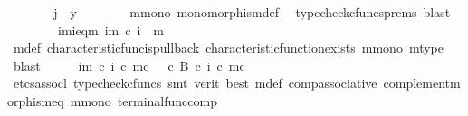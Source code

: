 \begin{isabellebody}
\ \ \ \ \isamarkupfalse%
\ \isamarkupfalse%
\ {\isachardoublequoteopen}j\ {\isacharequal}{\kern0pt}\ y{\isachardoublequoteclose}\isanewline
\ \ \ \ \ \ \isamarkupfalse%
\ m{\isacharunderscore}{\kern0pt}mono\ monomorphism{\isacharunderscore}{\kern0pt}def{}\ \isamarkupfalse%
\ {\isacharparenleft}{\kern0pt}typecheck{\isacharunderscore}{\kern0pt}cfuncs{\isacharunderscore}{\kern0pt}prems{\isacharcomma}{\kern0pt}\ blast{\isacharparenright}{\kern0pt}\isanewline
\ \ \isamarkupfalse%
\isanewline
\ \ \isamarkupfalse%
\ \isamarkupfalse%
\ {\isasymchi}im{\isacharunderscore}{\kern0pt}i{\isacharunderscore}{\kern0pt}eq{\isacharunderscore}{\kern0pt}{\isasymchi}m{\isacharcolon}{\kern0pt}\ {\isachardoublequoteopen}{\isasymchi}im\ {\isasymcirc}\isactrlsub c\ i\ {\isacharequal}{\kern0pt}\ {\isasymchi}m{\isachardoublequoteclose}\isanewline
\ \ \ \ \isamarkupfalse%
\ {\isasymchi}m{\isacharunderscore}{\kern0pt}def\ characteristic{\isacharunderscore}{\kern0pt}func{\isacharunderscore}{\kern0pt}is{\isacharunderscore}{\kern0pt}pullback\ characteristic{\isacharunderscore}{\kern0pt}function{\isacharunderscore}{\kern0pt}exists\ m{\isacharunderscore}{\kern0pt}mono\ m{\isacharunderscore}{\kern0pt}type\ \isamarkupfalse%
\ blast\isanewline
\ \ \isamarkupfalse%
\ \isamarkupfalse%
\ {\isachardoublequoteopen}{\isasymchi}im\ {\isasymcirc}\isactrlsub c\ {\isacharparenleft}{\kern0pt}i\ {\isasymcirc}\isactrlsub c\ m\isactrlsup c{\isacharparenright}{\kern0pt}\ {\isacharequal}{\kern0pt}\ {\isasymf}\ {\isasymcirc}\isactrlsub c\ {\isasymbeta}\isactrlbsub B\isactrlesub \ {\isasymcirc}\isactrlsub c\ {\isacharparenleft}{\kern0pt}i\ {\isasymcirc}\isactrlsub c\ m\isactrlsup c{\isacharparenright}{\kern0pt}{\isachardoublequoteclose}\isanewline
\ \ \ \ \isamarkupfalse%
\ {\isacharparenleft}{\kern0pt}etcs{\isacharunderscore}{\kern0pt}assocl{\isacharcomma}{\kern0pt}\ typecheck{\isacharunderscore}{\kern0pt}cfuncs{\isacharcomma}{\kern0pt}\ smt\ {\isacharparenleft}{\kern0pt}verit{\isacharcomma}{\kern0pt}\ best{\isacharparenright}{\kern0pt}\ {\isasymchi}m{\isacharunderscore}{\kern0pt}def\ comp{\isacharunderscore}{\kern0pt}associative{}\ complement{\isacharunderscore}{\kern0pt}morphism{\isacharunderscore}{\kern0pt}eq\ m{\isacharunderscore}{\kern0pt}mono\ terminal{\isacharunderscore}{\kern0pt}func{\isacharunderscore}{\kern0pt}comp{\isacharparenright}{\kern0pt}\isanewline
\ \ \isamarkupfalse%

\end{isabellebody}
